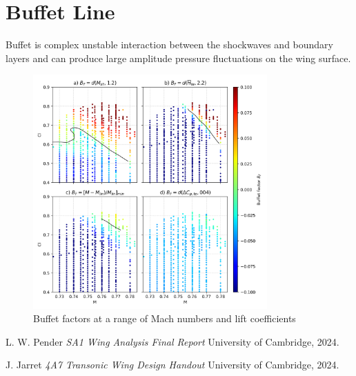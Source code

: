 \documentclass{article}
\begin{document}
\section{Buffet Line}

Buffet is complex unstable interaction between the shockwaves and boundary layers and can produce large amplitude pressure fluctuations on the wing surface.


\begin{figure}[H]
    \centering
    \includegraphics[width=0.8\textwidth]{figures/buffet_classification.png}
    \caption{Buffet factors at a range of Mach numbers and lift coefficients}
    \label{fig:buffet_classification}
\end{figure}

\begin{thebibliography}{9}


      L. W. Pender
      \emph{SA1 Wing Analysis Final Report}
      University of Cambridge,
      2024.
    
      J. Jarret
      \emph{4A7 Transonic Wing Design Handout}
      University of Cambridge,
      2024.
    
\end{thebibliography}
\end{document}
